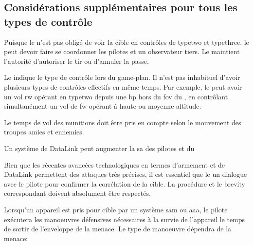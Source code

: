 \subsection{Considérations supplémentaires pour tous les types de contrôle}

\begin{e1}
	\item Puisque le \ja{} n'est pas obligé de voir la cible en contrôles de \gls{typetwo} et \gls{typethree}, le \ja{} peut devoir faire se coordonner les pilotes et un observateur tiers. Le \ja{} maintient l'autorité d'autoriser le tir ou d'annuler la passe.
	
	\item Le \ja{} indique le type de contrôle lors du game-plan. Il n'est pas inhabituel d'avoir plusieurs types de contrôles effectifs en même temps. Par exemple, le \ja{} peut avoir un vol \gls{rw} opérant en \gls{typetwo} depuis une \gls{bp} hors du \gls{fov} du \ja{}, en contrôlant simultanément un vol de \gls{fw} opérant à haute ou moyenne altitude.
	
	\item Le temps de vol des munitions doit être pris en compte selon le mouvement des troupes amies et ennemies.
	
	\item Un système de DataLink peut augmenter la \gls{sa} des pilotes et du \ja{}
	
	\item Bien que les récentes avancées technologiques en termes d'armement et de DataLink permettent des attaques très précises, il est essentiel que le \ja{} un dialogue avec le pilote pour confirmer la corrélation de la cible. La procédure et le brevity correspondant doivent absolument être respectés.
	
	
	\item Lorsqu'un appareil est pris pour cible par un système \gls{sam} ou \gls{aaa}, le pilote exécutera les manoeuvres défensives nécessaires à la survie de l'appareil le temps de sortir de l'enveloppe de la menace. Le type de manoeuvre dépendra de la menace:
	
	\begin{e2}
		
		
		

\end{e2}
\end{e1}
